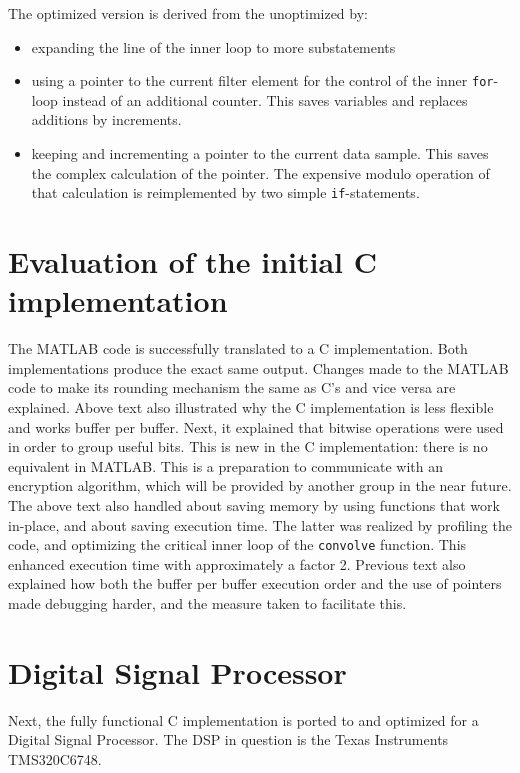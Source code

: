 \documentclass[a4paper]{article}
\begin{document}
\begin{minipage}{\textwidth}
The optimized version is derived from the unoptimized by:
\begin{itemize}
\item expanding the line of the inner loop to more substatements
\item using a pointer to the current filter element for the control of the inner \texttt{for}-loop instead of an additional counter. This saves variables and replaces additions by increments.
\item keeping and incrementing a pointer to the current data sample. This saves the complex calculation of the pointer. The expensive modulo operation of that calculation is reimplemented by two simple \texttt{if}-statements.
\end{itemize}
\end{minipage}

\section{Evaluation of the initial C implementation}
The MATLAB code is successfully translated to a C implementation. Both implementations produce the exact same output. Changes made to the MATLAB code to make its rounding mechanism the same as C's and vice versa are explained. Above text also illustrated why the C implementation is less flexible and works buffer per buffer. Next, it explained that bitwise operations were used in order to group useful bits. This is new in the C implementation: there is no equivalent in MATLAB. This is a preparation to communicate with an encryption algorithm, which will be provided by another group in the near future. The above text also handled about saving memory by using functions that work in-place, and about saving execution time. The latter was realized by profiling the code, and optimizing the critical inner loop of the \texttt{convolve} function. This enhanced execution time with approximately a factor 2. Previous text also explained how both the buffer per buffer execution order and the use of pointers made debugging harder, and the measure taken to facilitate this.

\section{Digital Signal Processor}
Next, the fully functional C implementation is ported to and optimized for a Digital Signal Processor. The DSP in question is the Texas Instruments TMS320C6748. 
\end{document}
